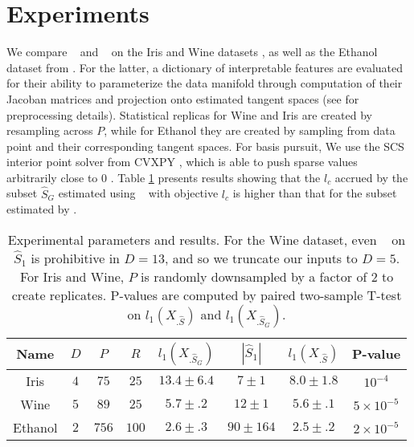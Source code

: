 \section{Experiments}
\label{sec:experiments}

We compare \tsip~ and \greedy~ on the Iris and Wine datasets \citep{misc_iris_53, misc_wine_109, scikit-learn}, as well as the Ethanol dataset from \citet{Chmiela2018-at, Koelle2022-ju}.
For the latter, a dictionary of interpretable features are evaluated for their ability to parameterize the data manifold through computation of their Jacoban matrices and projection onto estimated tangent spaces (see \citet{Koelle2022-ju} for preprocessing details).
Statistical replicas for Wine and Iris are created by resampling across $P$, while for Ethanol they are created by sampling from data point and their corresponding tangent spaces.
For basis pursuit, We use the SCS interior point solver \citep{ocpb:16} from CVXPY \citep{diamond2016cvxpy, agrawal2018rewriting}, which is able to push sparse values arbitrarily close to 0 \citep{cvxpy_sparse_solution}.
Table \ref{tab:experiments} presents results showing that the $l_c$ accrued by the subset $\widehat S_{G}$ estimated using \greedy~ with objective $l_c$ is higher than that for the subset estimated by \tsip.

\begin{table}[h!]
\centering
\begin{tabular}{|c|c|c|c|c|c|c|c|}
\hline
Name & $D$ & $P$ & $R$ & $l_1(X_{.\widehat S_{G}})$ & $ |\widehat S_1 | $& $l_1(X_{.\widehat S})$ &P-value \\ \hline
Iris & $4$ & $75$ & $25$ & $13.4 \pm 6.4$ & $7 \pm 1$ &  $8.0 \pm 1.8$ & $10^{-4}$\\ \hline 
Wine & $5$ & $89$ & $25$  & $5.7 \pm .2$ & $12 \pm 1$ & $5.6 \pm .1$ & $5 \times 10^{-5}$ \\ \hline
Ethanol & $2$ & $756$ & $100$ & $2.6\pm .3$  & $90 \pm 164$  & $2.5\pm .2$& $2 \times 10^{-5}$ \\ \hline
\end{tabular}
\caption{Experimental parameters and results.
For the Wine dataset, even \brute~ on $\widehat { S}_1$ is prohibitive in $D=13$, and so we truncate our inputs to $D=5$.
For Iris and Wine, $P$ is randomly downsampled by a factor of $2$ to create replicates.
P-values are computed by paired two-sample T-test on  $l_1(X_{.\widehat S})$ and $l_1(X_{.\widehat S_{G}})$.}
\label{tab:experiments}
\end{table}

